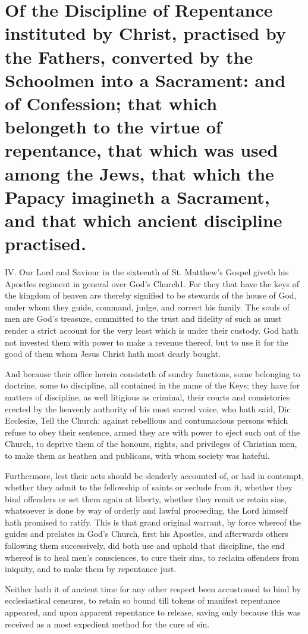 \section*{Of the Discipline of Repentance instituted by Christ, practised by the Fathers, converted by the Schoolmen into a Sacrament: and of Confession; that which belongeth to the virtue of repentance, that which was used among the Jews, that which the Papacy imagineth a Sacrament, and that which ancient discipline practised.}

IV. Our Lord and Saviour in the sixteenth of St. Matthew’s Gospel giveth his Apostles regiment in general over God’s Church1. For they that have the keys of the kingdom of heaven are thereby signified to be stewards of the house of God, under whom they guide, command, judge, and correct his family. The souls of men are God’s treasure, committed to the trust and fidelity of such as must render a strict account for the very least which is under their custody. God hath not invested them with power to make a revenue thereof, but to use it for the good of them whom Jesus Christ hath most dearly bought.

And because their office herein consisteth of sundry functions, some belonging to doctrine, some to discipline, all contained in the name of the Keys; they have for matters of discipline, as well litigious as criminal, their courts and consistories erected by the heavenly authority of his most sacred voice, who hath said, Dic Ecclesiæ, Tell the Church: against rebellious and contumacious persons which refuse to obey their sentence, armed they are with power to eject such out of the Church, to deprive them of the honours, rights, and privileges of Christian men, to make them as heathen and publicans, with whom society was hateful.

Furthermore, lest their acts should be slenderly accounted of, or had in contempt, whether they admit to the fellowship of saints or seclude from it, whether they bind offenders or set them again at liberty, whether they remit or retain sins, whatsoever is done by way of orderly and lawful proceeding, the Lord himself hath promised to ratify. This is that grand original warrant, by force whereof the guides and prelates in God’s Church, first his Apostles, and afterwards others following them successively, did both use and uphold that discipline, the end whereof is to heal men’s consciences, to cure their sins, to reclaim offenders from iniquity, and to make them by repentance just.

Neither hath it of ancient time for any other respect been accustomed to bind by ecclesiastical censures, to retain so bound till tokens of manifest repentance appeared, and upon apparent repentance to release, saving only because this was received as a most expedient method for the cure of sin.

